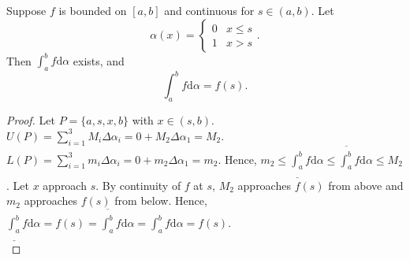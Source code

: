 \begin{thm}[15]
	Suppose $f$ is bounded on $[a,b]$ and continuous for $s \in (a,b)$.
	Let \[
		\alpha(x)=\begin{cases}
			0 & x\le s \\
			1 & x>s
		\end{cases}
		.\]
	Then $\int_{a}^{b}{f\mathrm{d}\alpha}$ exists, and
	\[
		\int_{a}^{b}{f\mathrm{d}\alpha}=f (s).
	\]
	\begin{proof}
		Let $P=\{a,s,x,b\}$ with $x \in (s,b)$.
		$U(P)=\sum_{i=1}^{3}{M_i \Delta \alpha_i}=0+M_2 \Delta \alpha_1=M_2$.
		$L(P)=\sum_{i=1}^{3}{m_i \Delta \alpha_i}=0+m_2 \Delta \alpha_1=m_2$.
		Hence, $m_2 \le \underline{\int_{a}^{b}}{f\mathrm{d}\alpha}\le \overline{\int_{a}^{b}}{f\mathrm{d}\alpha}\le M_2$.
		Let $x$ approach $s$.
		By continuity of $f$ at $s$, $M_2$ approaches $f(s)$ from above and $m_2$ approaches $f(s)$ from below. Hence, $\underline{\int_{a}^{b}}{f\mathrm{d}\alpha}= f(s)= \overline{\int_{a}^{b}}{f\mathrm{d}\alpha}= \int_{a}^{b}{f\mathrm{d}\alpha}=f(s)$.\\
\end{proof}
\end{thm}
